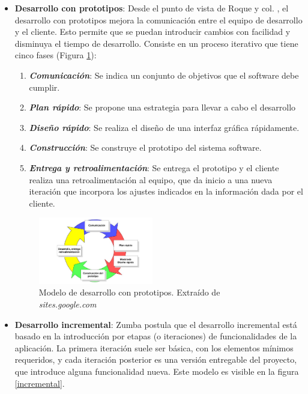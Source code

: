 \begin{itemize}
    \item \textbf{Desarrollo con prototipos}: Desde el punto de vista de Roque y col. \autocite*{RoqueHernandez2015}, el desarrollo con 
    prototipos mejora la comunicación entre el equipo de desarrollo y el cliente. Esto permite que se puedan introducir cambios con 
    facilidad y disminuya el tiempo de desarrollo. Consiste en un proceso iterativo que tiene cinco fases (Figura \ref*{iterative}):

    \begin{enumerate}
        \item \textbf{\textit{Comunicación}}: Se indica un conjunto de objetivos que el software debe cumplir.
        \item \textbf{\textit{Plan rápido}}: Se propone una estrategia para llevar a cabo el desarrollo
        \item \textbf{\textit{Diseño rápido}}: Se realiza el diseño de una interfaz gráfica rápidamente.
        \item \textbf{\textit{Construcción}}: Se construye el prototipo del sistema software.
        \item \textbf{\textit{Entrega y retroalimentación}}: Se entrega el prototipo y el cliente realiza una 
        retroalimentación al equipo, que da inicio a una nueva iteración que incorpora los ajustes indicados en la 
        información dada por el cliente.
    \end{enumerate}\medskip
    
    \begin{figure}[H]
        \centering
        \includegraphics[width=5cm]{Figures/modelo_prototipos.jpeg}
        \caption{Modelo de desarrollo con prototipos. Extraído de \textit{sites.google.com} \autocite*{Prototipos}}
        \label{iterative}
    \end{figure}
    \newpage
    \item \textbf{Desarrollo incremental}: Zumba \autocite*{Zumba2018} postula que el desarrollo incremental 
    está basado en la introducción por etapas (o iteraciones) de funcionalidades de la aplicación. La primera 
    iteración suele ser básica, con los elementos mínimos requeridos, y cada iteración posterior es una versión 
    entregable del proyecto, que introduce alguna funcionalidad nueva. Este modelo es visible en la figura \ref*{incremental}. \medskip


\end{itemize}
